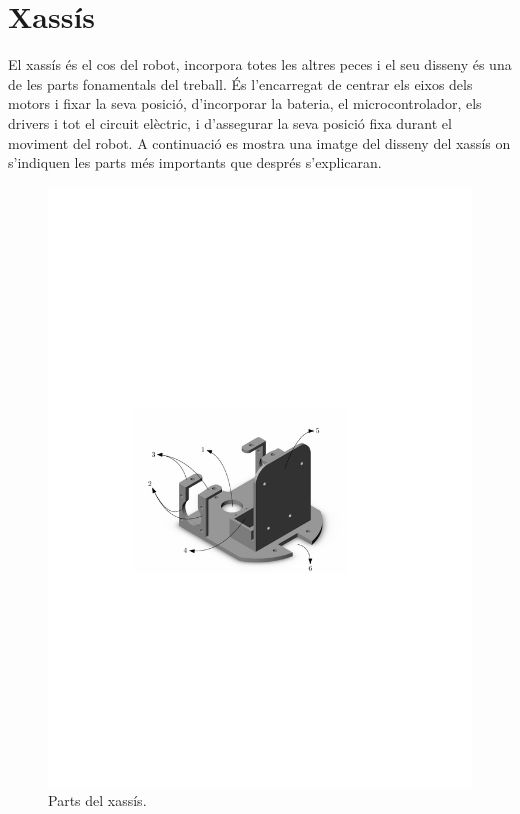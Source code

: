 \section{Xassís}

El xassís és el cos del robot, incorpora totes les altres peces i el seu disseny és una de les parts fonamentals del treball. És l’encarregat de centrar els eixos dels motors i fixar la seva posició, d’incorporar la bateria, el microcontrolador, els drivers i tot el circuit elèctric, i d'assegurar la seva posició fixa durant el moviment del robot. A continuació es mostra una imatge del disseny del xassís on s'indiquen les parts més importants que després s'explicaran. 

\begin{figure}[H]
	\centering
	\includegraphics{xassis}
	\caption{Parts del xassís.}
	\label{fig:xassis}
\end{figure}
 
